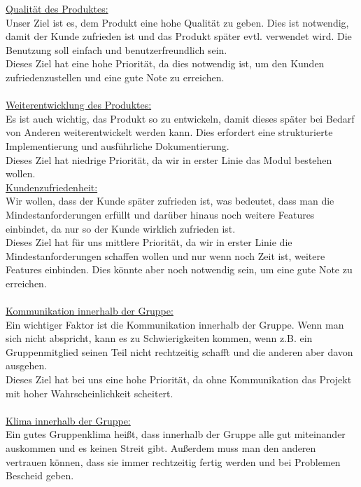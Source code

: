 \documentclass[fontsize=12pt,paper=a4,twoside]{scrartcl}
\begin{document}
\underline{Qualität des Produktes:} \\
Unser Ziel ist es, dem Produkt eine hohe Qualität zu geben. Dies ist notwendig, damit der Kunde zufrieden ist und das Produkt später evtl. verwendet wird. Die Benutzung soll einfach und benutzerfreundlich sein.\\
Dieses Ziel hat eine hohe Priorität, da dies notwendig ist, um den Kunden zufriedenzustellen und eine gute Note zu erreichen.\\
\bigskip \\
\underline{Weiterentwicklung des Produktes:} \\
Es ist auch wichtig, das Produkt so zu entwickeln, damit dieses später bei Bedarf von Anderen weiterentwickelt werden kann. Dies erfordert eine strukturierte Implementierung und ausführliche Dokumentierung.\\
Dieses Ziel hat niedrige Priorität, da wir in erster Linie das Modul bestehen wollen.
\bigskip \\
\underline{Kundenzufriedenheit:}\\
Wir wollen, dass der Kunde später zufrieden ist, was bedeutet, dass man die Mindestanforderungen erfüllt und darüber hinaus noch weitere Features einbindet, da nur so der Kunde wirklich zufrieden ist. \\
Dieses Ziel hat für uns mittlere Priorität, da wir in erster Linie die Mindestanforderungen schaffen wollen und nur wenn noch Zeit ist, weitere Features einbinden. Dies könnte aber noch notwendig sein, um eine gute Note zu erreichen.\\
\bigskip \\
\underline{Kommunikation innerhalb der Gruppe:} \\
Ein wichtiger Faktor ist die Kommunikation innerhalb der Gruppe. Wenn man sich nicht abspricht, kann es zu Schwierigkeiten kommen, wenn z.B. ein Gruppenmitglied seinen Teil nicht rechtzeitig schafft und die anderen aber davon ausgehen.\\
Dieses Ziel hat bei uns eine hohe Priorität, da ohne Kommunikation das Projekt mit hoher Wahrscheinlichkeit scheitert.\\
\bigskip \\
\underline{Klima innerhalb der Gruppe:} \\
Ein gutes Gruppenklima heißt, dass innerhalb der Gruppe alle gut miteinander auskommen und es keinen Streit gibt. Außerdem muss man den anderen vertrauen können, dass sie immer rechtzeitig fertig werden und bei Problemen Bescheid geben.\\
\end{document}
